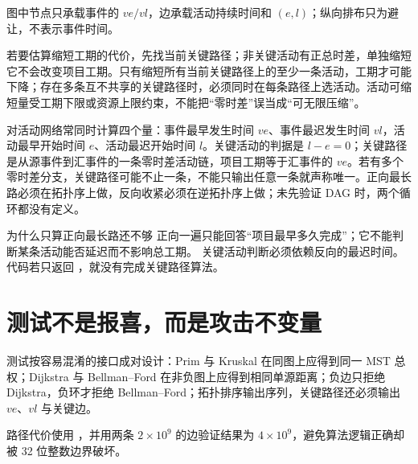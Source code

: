 \documentclass[UTF8,fontset=none,11pt,a4paper]{ctexart}
\begin{document}
\begin{center}
\resizebox{0.94\linewidth}{!}{}
\end{center}
图中节点只承载事件的 $ve/vl$，边承载活动持续时间和 $(e,l)$；纵向排布只为避让，不表示事件时间。

若要估算缩短工期的代价，先找当前关键路径；非关键活动有正总时差，单独缩短它不会改变项目工期。只有缩短所有当前关键路径上的至少一条活动，工期才可能下降；存在多条互不共享的关键路径时，必须同时在每条路径上选活动。活动可缩短量受工期下限或资源上限约束，不能把“零时差”误当成“可无限压缩”。

对活动网络常同时计算四个量：事件最早发生时间 $ve$、事件最迟发生时间 $vl$，活动最早开始时间 $e$、活动最迟开始时间 $l$。关键活动的判据是 $l-e=0$；关键路径是从源事件到汇事件的一条零时差活动链，项目工期等于汇事件的 $ve$。若有多个零时差分支，关键路径可能不止一条，不能只输出任意一条就声称唯一。正向最长路必须在拓扑序上做，反向收紧必须在逆拓扑序上做；未先验证 DAG 时，两个循环都没有定义。

\begin{corebox}{为什么只算正向最长路还不够}
正向一遍只能回答“项目最早多久完成”；它不能判断某条活动能否延迟而不影响总工期。
关键活动判断必须依赖反向的最迟时间。代码若只返回 ，就没有完成关键路径算法。
\end{corebox}



\section{测试不是报喜，而是攻击不变量}



测试按容易混淆的接口成对设计：Prim 与 Kruskal 在同图上应得到同一 MST 总权；Dijkstra 与 Bellman--Ford 在非负图上应得到相同单源距离；负边只拒绝 Dijkstra，负环才拒绝 Bellman--Ford；拓扑排序输出序列，关键路径还必须输出 $ve$、$vl$ 与关键边。

路径代价使用 ，并用两条 $2\times10^9$ 的边验证结果为 $4\times10^9$，避免算法逻辑正确却被 32 位整数边界破坏。
\end{document}
